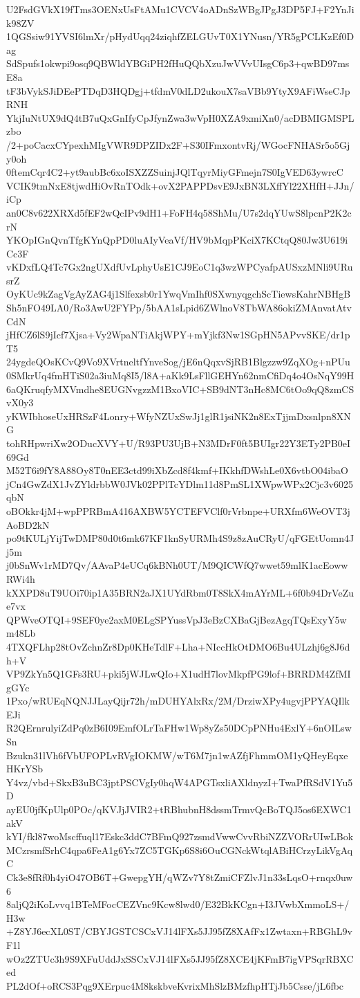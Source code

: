 U2FsdGVkX19fTms3OENxUsFtAMu1CVCV4oADnSzWBgJPgJ3DP5FJ+F2YnJik98ZV
1QGSsiw91YVSI6lmXr/pHydUqq24ziqhfZELGUvT0X1YNusn/YR5gPCLKzEf0Dag
SdSpufs1okwpi9osq9QBWldYBGiPH2fHuQQbXzuJwVVvUIsgC6p3+qwBD97msE8a
tF3bVykSJiDEePTDqD3HQDgj+tfdmV0dLD2ukouX7saVBb9YtyX9AFiWseCJpRNH
YkjIuNtUX9dQ4tB7uQxGnIfyCpJfynZwa3wVpH0XZA9xmiXn0/acDBMIGMSPLzbo
/2+poCacxCYpexhMIgVWR9DPZIDx2F+S30IFmxontvRj/WGocFNHASr5o5Gjy0oh
0ftemCqr4C2+yt9aubBc6xoISXZZSuinjJQlTqyrMiyGFmejn7S0IgVED63ywrcC
VCIK9tmNxE8tjwdHiOvRnTOdk+ovX2PAPPDsvE9JxBN3LXffYl22XHfH+JJn/iCp
an0C8v622XRXd5fEF2wQcIPv9dH1+FoFH4q58ShMu/U7s2dqYUwS8lpcnP2K2crN
YKOpIGnQvnTfgKYnQpPD0luAIyVeaVf/HV9bMqpPKciX7KCtqQ80Jw3U619iCc3F
vKDxfLQ4Tc7Gx2ngUXdfUvLphyUsE1CJ9EoC1q3wzWPCyafpAUSxzMNli9URusrZ
OyKUc9kZagVgAyZAG4j1Slfexsb0r1YwqVmIhf0SXwnyqgchScTiewsKahrNBHgB
Sh5nFO49LA0/Ro3AwU2FYPp/5bAA1sLpid6ZWlnoV8TbWA86okiZMAnvatAtvCdN
jHfCZ6lS9jIcf7Xjsa+Vy2WpaNTiAkjWPY+mYjkf3Nw1SGpHN5APvvSKE/dr1pT5
24ygdeQOsKCvQ9Vo9XVrtneltfYnveSog/jE6nQqxvSjRB1Blgzzw9ZqXOg+nPUu
0SMkrUq4fmHTiS02a3iuMq8I5/l8A+aKk9LsFllGEHYn62nmCfiDq4o4OsNqY99H
6aQKruqfyMXVmdhe8EUGNvgzzM1BxoVIC+SB9dNT3nHc8MC6tOo9qQ8zmCSvX0y3
yKWIbhoseUxHRSzF4Lonry+WfyNZUxSwJj1glR1jsiNK2n8ExTjjmDxsnlpn8XNG
tohRHpwriXw2ODucXVY+U/R93PU3UjB+N3MDrF0ft5BUIgr22Y3ETy2PB0eI69Gd
M52T6i9fY8A88Oy8T0nEE3ctd99iXbZcd8f4kmf+IKkhfDWshLe0X6vtbO04ibaO
jCn4GwZdX1JvZYldrbbW0JVk02PPlTcYDlm11d8PmSL1XWpwWPx2Cjc3v6025qbN
oBOkkr4jM+wpPPRBmA416AXBW5YCTEFVClf0rVrbnpe+URXfm6WeOVT3jAoBD2kN
po9tKULjYijTwDMP80d0t6mk67KF1knSyURMh4S9z8zAuCRyU/qFGEtUomn4Jj5m
j0bSnWv1rMD7Qv/AAvaP4eUCq6kBNh0UT/M9QICWfQ7wwet59mlK1acEowwRWi4h
kXXPD8uT9UOi70ip1A35BRN2aJX1UYdRbm0T8SkX4mAYrML+6f0b94DrVeZue7vx
QPWveOTQI+9SEF0ye2axM0ELgSPYussVpJ3eBzCXBaGjBezAgqTQsExyY5wm48Lb
4TXQFLhp28tOvZchnZr8Dp0KHeTdlF+Lha+NIccHkOtDMO6Bu4ULzhj6g8J6dh+V
VP9ZkYn5Q1GFs3RU+pki5jWJLwQIo+X1udH7lovMkpfPG9lof+BRRDM4ZfMIgGYc
1Pxo/wRUEqNQNJJLayQijr72h/mDUHYAlxRx/2M/DrziwXPy4ugvjPPYAQIlkEJi
R2QErnrulyiZdPq0zB6I09EmfOLrTaFHw1Wp8yZs50DCpPNHu4ExlY+6nOILswSn
Bzukn31lVh6fVbUFOPLvRVgIOKMW/wT6M7jn1wAZfjFhmmOM1yQHeyEqxeHKrYSb
Y4vz/vbd+SkxB3uBC3jptPSCVgIy0hqW4APGTsxliAXldnyzI+TwaPfRSdV1Yu5D
ayEU0jfKpUlp0POc/qKVJjJVIR2+tRBhubnH8dssmTrmvQcBoTQJ5os6EXWC1akV
kYI/fkl87woMscffuql17Eskc3ddC7BFmQ927zsmdVwwCvvRbiNZZVORrUIwLBok
MCzrsmfSrhC4qpa6FeA1g6Yx7ZC5TGKp6S8i6OuCGNckWtqlABiHCrzyLikVgAqC
Ck3e8fRf0h4yiO47OB6T+GwepgYH/qWZv7Y8tZmiCFZlvJ1n33sLqsO+rnqx0uw6
8aljQ2iKoLvvq1BTeMFocCEZVnc9Kcw8lwd0/E32BkKCgn+I3JVwbXmmoLS+/H3w
+Z8YJ6ecXL0ST/CBYJGSTCSCxVJ14lFXs5JJ95fZ8XAfFx1Zwtaxn+RBGhL9vF1l
wOz2ZTUc3h9S9XFuUddJxSSCxVJ14lFXs5JJ95fZ8XCE4jKFmB7igVPSqrRBXCed
PL2dOf+oRCS3Pqg9XErpuc4M8kskbveKvrixMhSlzBMzfhpHTjJb5Csse/jL6fbc
